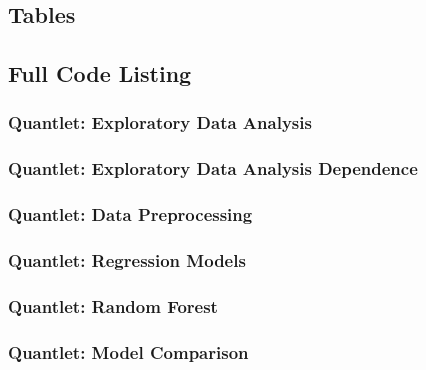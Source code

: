 \subsection{Tables}











\FloatBarrier

\subsection{Full Code Listing}
\subsubsection{Quantlet: Exploratory Data Analysis}

\subsubsection{Quantlet: Exploratory Data Analysis Dependence}

\subsubsection{Quantlet: Data Preprocessing}

\subsubsection{Quantlet: Regression Models}

\subsubsection{Quantlet: Random Forest}

\subsubsection{Quantlet: Model Comparison}

